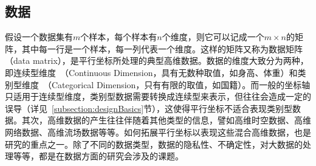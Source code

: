 \documentclass[12pt,twocolumn]{article}
\begin{document}
\subsection{数据}
\label{subsection:dataBasics}
假设一个数据集有$m$个样本，每个样本有$n$个维度，则它可以记成一个$m \times n$的矩阵，其中每一行是一个样本，每一列代表一个维度。这样的矩阵又称为数据矩阵（data matrix），是平行坐标所处理的典型高维数据。数据的维度大致分为两种，即连续型维度~（Continuous Dimension，具有无数种取值，如身高、体重）和类别型维度~（Categorical Dimension，只有有限的取值，如国籍）。而一般的坐标轴只适用于连续型维度，类别型数据需要转换成连续型来表示，但往往会造成一定的误导（详见~\ref{subsection:designBasics}节），这使得平行坐标不适合表现类别型数据。其次，高维数据的产生往往伴随着其他类型的信息，譬如高维时空数据、高维网络数据、高维流场数据等等。如何拓展平行坐标以表现这些混合高维数据，也是研究的重点之一。除了不同的数据类型，数据的隐私性、不确定性，对大数据的处理等等，都是在数据方面的研究会涉及的课题。                                                                                                                                                                                                                                                                                                                                                                                                                                                                                                                                                                                                                                                                                                                                                                                                                                                                                                                                                                                                                                                                                                                                                                                                                                                                                                                                                                                                                                                                                                                                                                                                                                                                                                                                                                                                                                                                                                                                                                                                                                                                                                                                                                                                                                                                                                                                                                                                                                             
\end{document}

